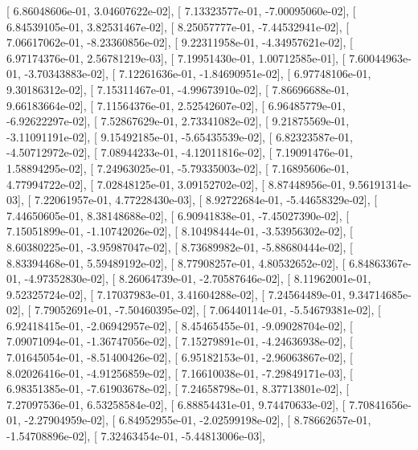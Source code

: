 \documentclass{article}
\begin{document}
       [  6.86048606e-01,   3.04607622e-02],
       [  7.13323577e-01,  -7.00095060e-02],
       [  6.84539105e-01,   3.82531467e-02],
       [  8.25057777e-01,  -7.44532941e-02],
       [  7.06617062e-01,  -8.23360856e-02],
       [  9.22311958e-01,  -4.34957621e-02],
       [  6.97174376e-01,   2.56781219e-03],
       [  7.19951430e-01,   1.00712585e-01],
       [  7.60044963e-01,  -3.70343883e-02],
       [  7.12261636e-01,  -1.84690951e-02],
       [  6.97748106e-01,   9.30186312e-02],
       [  7.15311467e-01,  -4.99673910e-02],
       [  7.86696688e-01,   9.66183664e-02],
       [  7.11564376e-01,   2.52542607e-02],
       [  6.96485779e-01,  -6.92622297e-02],
       [  7.52867629e-01,   2.73341082e-02],
       [  9.21875569e-01,  -3.11091191e-02],
       [  9.15492185e-01,  -5.65435539e-02],
       [  6.82323587e-01,  -4.50712972e-02],
       [  7.08944233e-01,  -4.12011816e-02],
       [  7.19091476e-01,   1.58894295e-02],
       [  7.24963025e-01,  -5.79335003e-02],
       [  7.16895606e-01,   4.77994722e-02],
       [  7.02848125e-01,   3.09152702e-02],
       [  8.87448956e-01,   9.56191314e-03],
       [  7.22061957e-01,   4.77228430e-03],
       [  8.92722684e-01,  -5.44658329e-02],
       [  7.44650605e-01,   8.38148688e-02],
       [  6.90941838e-01,  -7.45027390e-02],
       [  7.15051899e-01,  -1.10742026e-02],
       [  8.10498444e-01,  -3.53956302e-02],
       [  8.60380225e-01,  -3.95987047e-02],
       [  8.73689982e-01,  -5.88680444e-02],
       [  8.83394468e-01,   5.59489192e-02],
       [  8.77908257e-01,   4.80532652e-02],
       [  6.84863367e-01,  -4.97352830e-02],
       [  8.26064739e-01,  -2.70587646e-02],
       [  8.11962001e-01,   9.52325724e-02],
       [  7.17037983e-01,   3.41604288e-02],
       [  7.24564489e-01,   9.34714685e-02],
       [  7.79052691e-01,  -7.50460395e-02],
       [  7.06440114e-01,  -5.54679381e-02],
       [  6.92418415e-01,  -2.06942957e-02],
       [  8.45465455e-01,  -9.09028704e-02],
       [  7.09071094e-01,  -1.36747056e-02],
       [  7.15279891e-01,  -4.24636938e-02],
       [  7.01645054e-01,  -8.51400426e-02],
       [  6.95182153e-01,  -2.96063867e-02],
       [  8.02026416e-01,  -4.91256859e-02],
       [  7.16610038e-01,  -7.29849171e-03],
       [  6.98351385e-01,  -7.61903678e-02],
       [  7.24658798e-01,   8.37713801e-02],
       [  7.27097536e-01,   6.53258584e-02],
       [  6.88854431e-01,   9.74470633e-02],
       [  7.70841656e-01,  -2.27904959e-02],
       [  6.84952955e-01,  -2.02599198e-02],
       [  8.78662657e-01,  -1.54708896e-02],
       [  7.32463454e-01,  -5.44813006e-03],
\end{document}
